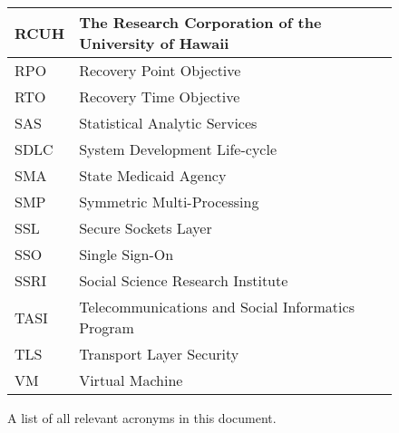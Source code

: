 \begin{figure}[H]
\begin{center}
\begin{tabular}{|>{\raggedright\arraybackslash}l 
                    |>{\raggedright\arraybackslash}l 
                    |}
    RCUH & The Research Corporation of the University of Hawaii\\\hline
    RPO & Recovery Point Objective\\\hline
    RTO & Recovery Time Objective\\\hline
    SAS & Statistical Analytic Services\\\hline
    SDLC & System Development Life-cycle\\\hline
    SMA & State Medicaid Agency\\\hline
    SMP & Symmetric Multi-Processing\\\hline
    SSL & Secure Sockets Layer\\\hline
    SSO & Single Sign-On\\\hline
    SSRI & Social Science Research Institute \\\hline
    TASI & Telecommunications and Social Informatics Program \\\hline
    TLS & Transport Layer Security\\\hline
    VM & Virtual Machine\\\hline
    \end{tabular}
\end{center}
\caption{A list of all relevant acronyms in this document.}
\label{Acronyms}
\end{figure}